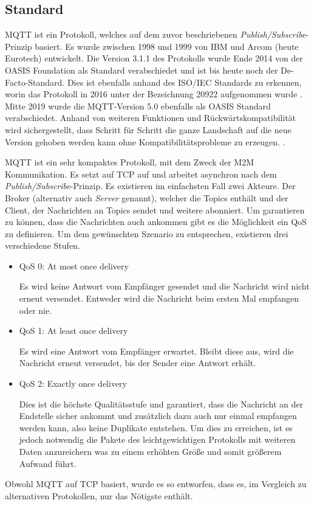     \subsection{Standard}
        \ac{MQTT} ist ein Protokoll, welches auf dem zuvor beschriebenen \emph{Publish/Subscribe}-Prinzip basiert. Es wurde zwischen 1998 und 1999 von IBM und Arcom (heute Eurotech) entwickelt. Die Version 3.1.1 des Protokolls wurde Ende 2014 von der OASIS Foundation als Standard verabschiedet und ist bis heute noch der De-Facto-Standard. Dies ist ebenfalls anhand des ISO/IEC Standards zu erkennen, worin das Protokoll in 2016 unter der Bezeichnung 20922 aufgenommen wurde \cite{eclipse_foundation2017}. Mitte 2019 wurde die MQTT-Version 5.0 ebenfalls als OASIS Standard verabschiedet. Anhand von weiteren Funktionen und Rückwärtskompatibilität wird sichergestellt, dass Schritt für Schritt die ganze Landschaft auf die neue Version gehoben werden kann ohne Kompatibilitätsprobleme zu erzeugen. \cite{mqtt_org_2019}.
        
        \ac{MQTT} ist ein sehr kompaktes Protokoll, mit dem Zweck der \ac{M2M} Kommunikation.
        Es setzt auf \ac{TCP} auf und arbeitet asynchron
        nach dem \emph{Publish/Subscribe}-Prinzip. Es existieren im einfachsten Fall zwei Akteure. Der Broker (alternativ auch \emph{Server} genannt), welcher die Topics enthält und der Client, der Nachrichten an Topics sendet und weitere abonniert.
        Um garantieren zu können, dass die Nachrichten auch ankommen gibt es die Möglichkeit ein \ac{QoS} zu definieren. Um dem gewünschten Szenario zu entsprechen, existieren drei verschiedene Stufen. 
        \cite{soni2017survey}
        \begin{itemize}
            \item \glqq QoS 0: At most once delivery\grqq{}
            
            Es wird keine Antwort vom Empfänger gesendet und die Nachricht wird nicht erneut versendet. Entweder wird die Nachricht beim ersten Mal empfangen oder nie.
            \item \glqq QoS 1: At least once delivery\grqq{}
            
            Es wird eine Antwort vom Empfänger erwartet. Bleibt diese aus, wird die Nachricht erneut versendet, bis der Sender eine Antwort erhält.
            \item \glqq QoS 2: Exactly once delivery\grqq{}
            
            Dies ist die höchste Qualitätsstufe und garantiert, dass die Nachricht an der Endstelle sicher ankommt und zusätzlich dazu auch nur einmal empfangen werden kann, also keine Duplikate entstehen. Um dies zu erreichen, ist es jedoch notwendig die Pakete des leichtgewichtigen Protokolls mit weiteren Daten anzureichern was zu einem erhöhten Größe und somit größerem Aufwand führt.
        \end{itemize} \cite{gupta_banks_2015}
        Obwohl \ac{MQTT} auf \ac{TCP} basiert, wurde es so entworfen, dass es, im Vergleich zu alternativen Protokollen, nur das Nötigste enthält. \cite{soni2017survey}


